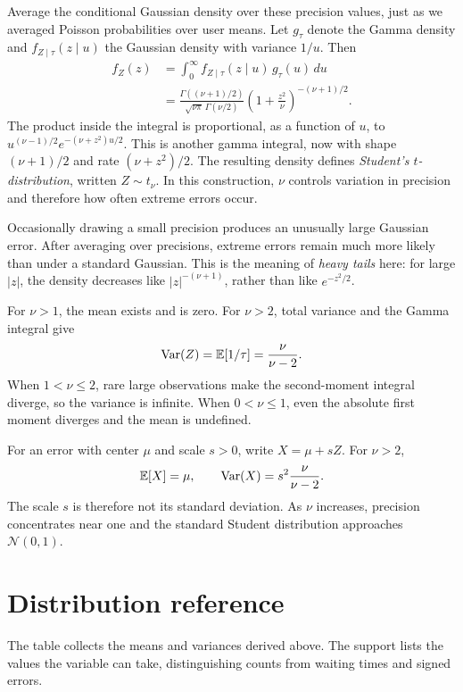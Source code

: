 Average the conditional Gaussian density over these precision values,
just as we averaged Poisson probabilities over user means.
Let \(g_\tau\) denote the Gamma density and \(f_{Z\mid\tau}(z\mid u)\)
the Gaussian density with variance \(1/u\). Then
\begin{align*}
  f_Z(z)&=\int_0^\infty f_{Z\mid\tau}(z\mid u)\,g_\tau(u)\,du\\
  &=\frac{\Gamma((\nu+1)/2)}
       {\sqrt{\nu\pi}\,\Gamma(\nu/2)}
    \left(1+\frac{z^2}{\nu}\right)^{-(\nu+1)/2}.
\end{align*}
The product inside the integral is proportional, as a function of \(u\),
to \(u^{(\nu-1)/2}e^{-(\nu+z^2)u/2}\).
This is another gamma integral, now with shape \((\nu+1)/2\)
and rate \((\nu+z^2)/2\).
The resulting density defines \emph{Student's \(t\)-distribution},
written \(Z\sim t_\nu\).
In this construction, \(\nu\) controls variation in precision and
therefore how often extreme errors occur.

Occasionally drawing a small precision produces an unusually large
Gaussian error. After averaging over precisions, extreme errors remain
much more likely than under a standard Gaussian. This is the meaning
of \emph{heavy tails} here: for large \(|z|\), the density decreases
like \(|z|^{-(\nu+1)}\), rather than like \(e^{-z^2/2}\).

For \(\nu>1\), the mean exists and is zero. For \(\nu>2\), total variance
and the Gamma integral give
\[
  \operatorname{Var}(Z)=\mathbb{E}[1/\tau]=\frac{\nu}{\nu-2}.
\]
When \(1<\nu\le2\), rare large observations make the second-moment
integral diverge, so the variance is infinite.
When \(0<\nu\le1\), even the absolute first moment diverges and the
mean is undefined.

For an error with center \(\mu\) and scale \(s>0\), write \(X=\mu+sZ\).
For \(\nu>2\),
\[
  \mathbb{E}[X]=\mu,\qquad
  \operatorname{Var}(X)=s^2\frac{\nu}{\nu-2}.
\]
The scale \(s\) is therefore not its standard deviation.
As \(\nu\) increases, precision concentrates near one and the standard
Student distribution approaches \(\mathcal N(0,1)\).

\clearpage
\section{Distribution reference}
\label{sec:distribution-reference}

The table collects the means and variances derived above. The support lists
the values the variable can take, distinguishing counts from waiting times
and signed errors.

